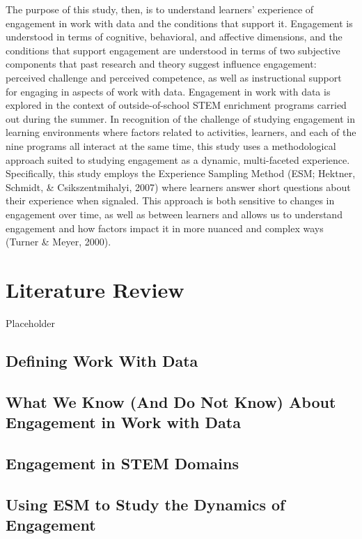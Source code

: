 \documentclass[]{book}
\begin{document}
The purpose of this study, then, is to understand learners' experience
of engagement in work with data and the conditions that support it.
Engagement is understood in terms of cognitive, behavioral, and
affective dimensions, and the conditions that support engagement are
understood in terms of two subjective components that past research and
theory suggest influence engagement: perceived challenge and perceived
competence, as well as instructional support for engaging in aspects of
work with data. Engagement in work with data is explored in the context
of outside-of-school STEM enrichment programs carried out during the
summer. In recognition of the challenge of studying engagement in
learning environments where factors related to activities, learners, and
each of the nine programs all interact at the same time, this study uses
a methodological approach suited to studying engagement as a dynamic,
multi-faceted experience. Specifically, this study employs the
Experience Sampling Method (ESM; Hektner, Schmidt, \& Csikszentmihalyi,
2007) where learners answer short questions about their experience when
signaled. This approach is both sensitive to changes in engagement over
time, as well as between learners and allows us to understand engagement
and how factors impact it in more nuanced and complex ways (Turner \&
Meyer, 2000).

\chapter{Literature Review}\label{literature-review}

Placeholder

\section{Defining Work With Data}\label{defining-work-with-data}

\section{What We Know (And Do Not Know) About Engagement in Work with
Data}\label{what-we-know-and-do-not-know-about-engagement-in-work-with-data}

\section{Engagement in STEM Domains}\label{engagement-in-stem-domains}

\section{Using ESM to Study the Dynamics of
Engagement}\label{using-esm-to-study-the-dynamics-of-engagement}
\end{document}

